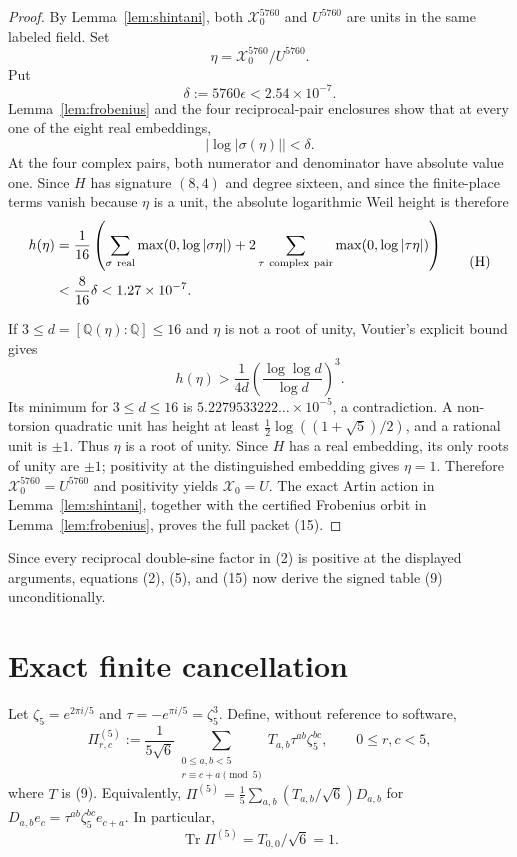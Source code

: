 \documentclass[11pt]{article}
\newcommand{\Tr}{\operatorname{Tr}}
\newcommand{\Q}{\mathbb Q}
\begin{document}
\begin{proof}
By Lemma~\ref{lem:shintani}, both
$\mathcal X_0^{5760}$ and $U^{5760}$ are units in the same labeled
field.  Set
\[
 \eta=\mathcal X_0^{5760}/U^{5760}.
\]
Put
\[
 \delta:=5760\epsilon<2.54\times10^{-7}.
\]
Lemma~\ref{lem:frobenius} and the four reciprocal-pair enclosures show
that at every one of the eight real embeddings,
\[
 |\log|\sigma(\eta)||<\delta.
\]
At the four complex pairs, both numerator and denominator have
absolute value one.  Since $H$ has signature $(8,4)$ and degree
sixteen, and since the finite-place terms vanish because $\eta$ is a
unit, the absolute logarithmic Weil height is therefore
\[
\begin{aligned}
 h(\eta)
 &=\frac1{16}\left(
 \sum_{\sigma\ {\rm real}}\max(0,\log|\sigma\eta|)
 +2\sum_{\tau\ {\rm complex\ pair}}\max(0,\log|\tau\eta|)
 \right)\\
 &<\frac8{16}\delta
 <1.27\times10^{-7}.
\end{aligned}
\tag{H}
\]

If $3\le d=[\Q(\eta):\Q]\le16$ and $\eta$ is not a root of unity,
Voutier's explicit bound \cite{Voutier1996} gives
\[
 h(\eta)>
 \frac1{4d}\left(\frac{\log\log d}{\log d}\right)^3.
\]
Its minimum for $3\le d\le16$ is
$5.2279533222\ldots\times10^{-5}$, a contradiction.  A non-torsion
quadratic unit has height at least
$\tfrac12\log((1+\sqrt5)/2)$, and a rational unit is $\pm1$.
Thus $\eta$ is a root of unity.  Since $H$ has a real embedding, its
only roots of unity are $\pm1$; positivity at the distinguished
embedding gives $\eta=1$.  Therefore
$\mathcal X_0^{5760}=U^{5760}$ and positivity yields
$\mathcal X_0=U$.  The exact Artin action in
Lemma~\ref{lem:shintani}, together with the certified Frobenius orbit
in Lemma~\ref{lem:frobenius}, proves the full packet (15).
\end{proof}

Since every reciprocal double-sine factor in (2) is positive at the
displayed arguments, equations (2), (5), and (15) now derive the
signed table (9) unconditionally.

\section{Exact finite cancellation}

Let $\zeta_5=e^{2\pi i/5}$ and
$\tau=-e^{\pi i/5}=\zeta_5^3$.  Define, without reference to software,
\[
 \Pi^{(5)}_{r,c}:=\frac1{5\sqrt6}
 \sum_{\substack{0\le a,b<5\\r\equiv c+a\pmod5}}
 T_{a,b}\tau^{ab}\zeta_5^{bc},
 \qquad 0\le r,c<5,
\tag{17}
\]
where $T$ is (9).  Equivalently,
$\Pi^{(5)}=\frac15\sum_{a,b}(T_{a,b}/\sqrt6)D_{a,b}$ for
$D_{a,b}e_c=\tau^{ab}\zeta_5^{bc}e_{c+a}$.
In particular,
\[
 \Tr\Pi^{(5)}=T_{0,0}/\sqrt6=1.
\tag{18}
\]
\end{document}
